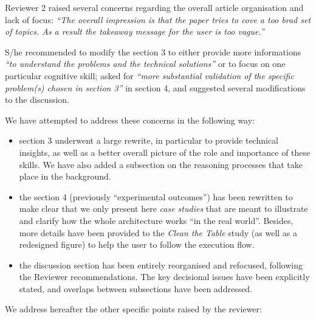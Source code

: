 \documentclass{article}
\begin{document}
Reviewer 2 raised several concerns regarding the overall article organisation
and lack of focus: \emph{``The overall impression is that the paper tries to
cove a too brad set of topics. As a result the takeaway message for the user is
too vague.''}

S/he recommended to modify the section 3 to either provide more informations
\emph{``to understand the problems and the technical solutions''} or to focus on
one particular cognitive skill; asked for \emph{``more substantial validation
of the specific problem(s) chosen in section 3''} in section 4, and suggested
several modifications to the discussion.

We have attempted to address these concerns in the following way:

\begin{itemize}
    \item section 3 underwent a large rewrite, in particular to provide
        technical insights, as well as a better overall picture of the role and
        importance of these skills. We have also added a subsection on the
        reasoning processes that take place in the background.
    \item the section 4 (previously ``experimental outcomes'') has been
        rewritten to make clear that we only present here \emph{case studies}
        that are meant to illustrate and clarify how the whole architecture
        works ``in the real world''. Besides, more details have been provided to the
        \emph{Clean the Table} study (as well as a redesigned figure) to help
        the user to follow the execution flow.
    \item the discussion section has been entirely reorganised and refocused, following the
        Reviewer recommendations. The key decisional issues have been explicitly
        stated, and overlaps between subsections have been addressed.
\end{itemize}

We address hereafter the other specific points raised by the reviewer:
\end{document}
